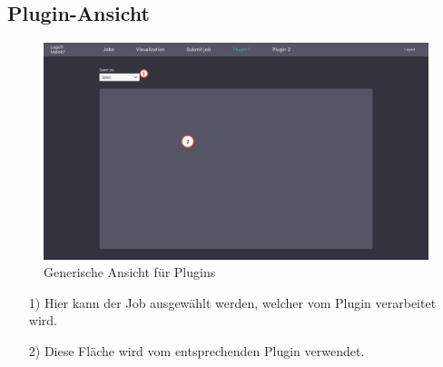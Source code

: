 \newpage
\subsection{Plugin-Ansicht}
\label{pages:plugin}
\begin{figure}[H]
    \centering
    \includegraphics[width=\textwidth]{images-interface/v3_interface/plugin_page_v3.pdf}
    \caption{Generische Ansicht für Plugins}
    \label{fig:plugin-page}
\end{figure}
\begin{itemize}
    \item[1)] Hier kann der Job ausgewählt werden, welcher vom Plugin verarbeitet wird.
    \item[2)] Diese Fläche wird vom entsprechenden Plugin verwendet.
\end{itemize}

\newpage
